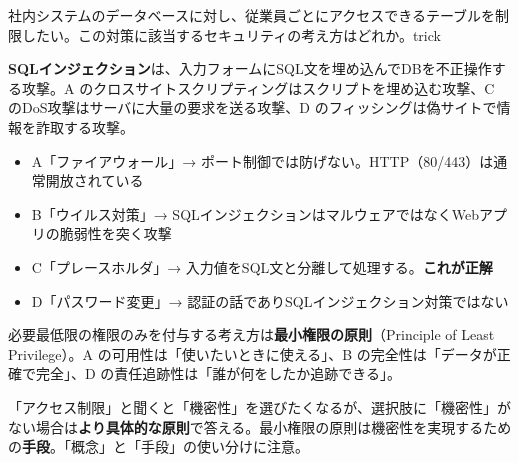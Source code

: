 \begin{mondai}{社内システムのデータベースに対し、従業員ごとにアクセスできるテーブルを制限したい。この対策に該当するセキュリティの考え方はどれか。}{trick}
\end{mondai}

\kaitoupage


\begin{kaisetsu}
\textbf{SQLインジェクション}は、入力フォームにSQL文を埋め込んでDBを不正操作する攻撃。A のクロスサイトスクリプティングはスクリプトを埋め込む攻撃、C のDoS攻撃はサーバに大量の要求を送る攻撃、D のフィッシングは偽サイトで情報を詐取する攻撃。
\end{kaisetsu}


\begin{goutoubun}
\begin{itemize}
  \item A「ファイアウォール」→ ポート制御では防げない。HTTP（80/443）は通常開放されている
  \item B「ウイルス対策」→ SQLインジェクションはマルウェアではなくWebアプリの脆弱性を突く攻撃
  \item C「プレースホルダ」→ 入力値をSQL文と分離して処理する。\textbf{これが正解}
  \item D「パスワード変更」→ 認証の話でありSQLインジェクション対策ではない
\end{itemize}
\end{goutoubun}


\begin{kaisetsu}
必要最低限の権限のみを付与する考え方は\textbf{最小権限の原則}（Principle of Least Privilege）。A の可用性は「使いたいときに使える」、B の完全性は「データが正確で完全」、D の責任追跡性は「誰が何をしたか追跡できる」。
\end{kaisetsu}

\begin{trickwarn}
「アクセス制限」と聞くと「機密性」を選びたくなるが、選択肢に「機密性」がない場合は\textbf{より具体的な原則}で答える。最小権限の原則は機密性を実現するための\textbf{手段}。「概念」と「手段」の使い分けに注意。
\end{trickwarn}


